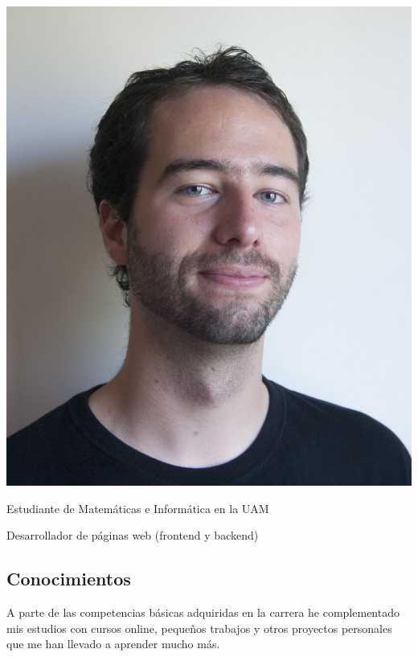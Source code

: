 \documentclass[a4paper, 10pt]{article}
\newcommand{\CVSection}[1]{ {\setromanfont[Numbers=Uppercase]{Helvetica}\selectfont \section*{#1}} }
\begin{document}
  \begin{minipage}{0.25\linewidth}   

  	\vspace{100pt}
  	\includegraphics[width=0.23\linewidth]{images/me.jpg}

  \end{minipage}
  \begin{minipage}{0.75\linewidth}

  	\begin{flushright}

  		\vspace{-35pt}

	  	{}

	  	\vspace{25pt}

		{\selectfont

			{\fontsize{1.6em}{2em}\selectfont Estudiante de Matemáticas e Informática en la UAM

			Desarrollador de páginas web (frontend y backend)

			
			}
		}

	\end{flushright}

  \end{minipage}

\vspace{-10mm}
\begin{flushright}
\CVSection{Conocimientos}

\end{flushright}

A parte de las competencias básicas adquiridas en la carrera he complementado mis estudios con cursos online, pequeños trabajos y otros proyectos personales que me han llevado a aprender mucho más.
\end{document}
